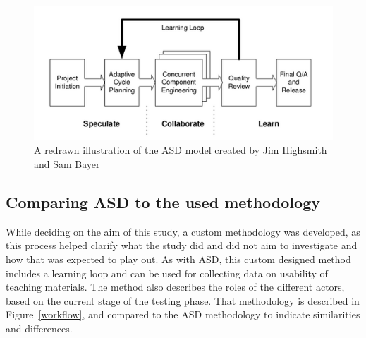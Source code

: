 \begin{figure}
\hspace*{-1cm}
\centering
\includegraphics{figure/asd.png}
\caption{A redrawn illustration of the ASD model created by Jim Highsmith and Sam Bayer}
\label{asd}
\end{figure}


\subsection{Comparing ASD to the used methodology}
While deciding on the aim of this study, a custom methodology was developed, as this process helped clarify what the study did and did not aim to investigate and how that was expected to play out. As with ASD, this custom designed method includes a learning loop and can be used for collecting data on usability of teaching materials. The method also describes the roles of the different actors, based on the current stage of the testing phase. That methodology is described in Figure~\ref{workflow}, and compared to the ASD methodology to indicate similarities and differences.

